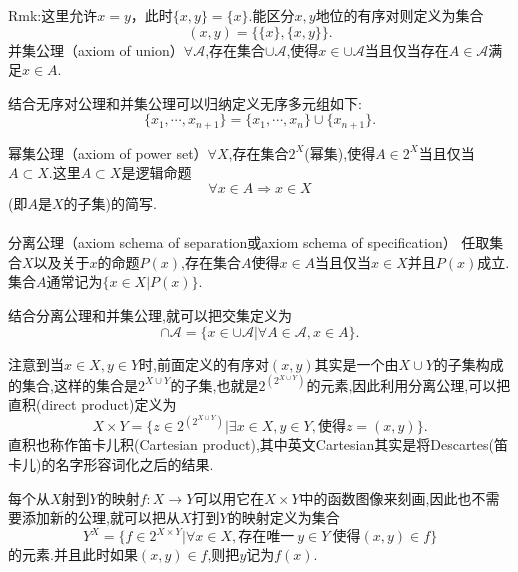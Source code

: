 Rmk:这里允许$x=y$，此时$\{x,y\}=\{x\}$.能区分$x,y$地位的有序对则定义为集合
\begin{equation}
(x,y) = \{\{x\},\{x,y\}\}.
\end{equation}
并集公理（axiom of union）$\forall \mathcal{A}$,存在集合$\cup\mathcal{A}$,使得$x\in\cup\mathcal{A}$当且仅当存在$A\in\mathcal{A}$满足$x\in A$.

结合无序对公理和并集公理可以归纳定义无序多元组如下:
\begin{equation}
\{x_1,\cdots,x_{n+1} \} = \{x_1,\cdots,x_{n} \} \cup \{x_{n+1}\}.
\end{equation}

幂集公理（axiom of power set）$\forall X$,存在集合$2^{X}$(幂集),使得$A\in 2^{X}$当且仅当 $A\subset X$.这里$A\subset X$是逻辑命题
\begin{equation}
\forall x\in A\Rightarrow x\in X
\end{equation}
(即$A$是$X$的子集)的简写.
\\ \hspace*{\fill} \\%
分离公理（axiom schema of separation或axiom schema of specification） 任取集合$X$以及关于$x$的命题$P(x)$,存在集合$A$使得$x\in A$当且仅当$x\in X$并且$P(x)$成立.集合$A$通常记为$\{x\in X|P(x)\}$.

结合分离公理和并集公理,就可以把交集定义为
\begin{equation}
\cap \mathcal{A} = \{x\in\cup\mathcal{A}|\forall A\in\mathcal{A},x\in A \}.
\end{equation}

注意到当$x\in X,y\in Y$时,前面定义的有序对$(x,y)$其实是一个由$X\cup Y$的子集构成的集合,这样的集合是$2^{X\cup Y}$的子集,也就是$2^{(2^{X\cup Y})}$的元素,因此利用分离公理,可以把直积(direct product)定义为
\begin{equation}
X\times Y = \{ z\in 2^{(2^{X\cup Y})}| \exists x\in X,y\in Y,\text{使得}z=(x,y) \}.
\end{equation}
直积也称作笛卡儿积(Cartesian product),其中英文Cartesian其实是将Descartes(笛卡儿)的名字形容词化之后的结果.

每个从$X$射到$Y$的映射$f:X\rightarrow Y$可以用它在$X\times Y$中的函数图像来刻画,因此也不需要添加新的公理,就可以把从$X$打到$Y$的映射定义为集合
\begin{equation}
Y^X = \{f\in 2^{X\times Y} | \forall x\in X,\text{存在唯一}\ y\in Y\ \text{使得}(x,y)\in f \}
\end{equation}
的元素.并且此时如果$(x,y)\in f$,则把$y$记为$f(x)$.

